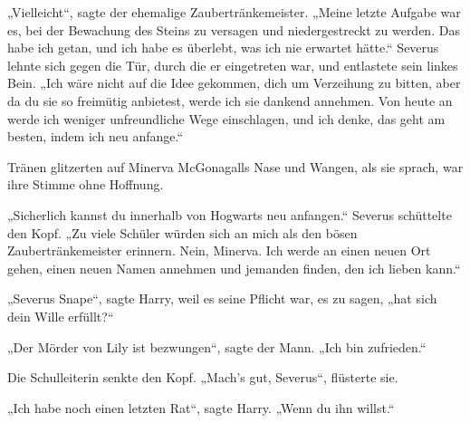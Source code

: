 „Vielleicht“, sagte der ehemalige Zaubertränkemeister. „Meine letzte Aufgabe war es, bei der Bewachung des Steins zu versagen und niedergestreckt zu werden. Das habe ich getan, und ich habe es überlebt, was ich nie erwartet hätte.“
Severus lehnte sich gegen die Tür, durch die er eingetreten war, und entlastete sein linkes Bein.
„Ich wäre nicht auf die Idee gekommen, dich um Verzeihung zu bitten, aber da du sie so freimütig anbietest, werde ich sie dankend annehmen. Von heute an werde ich weniger unfreundliche Wege einschlagen, und ich denke, das geht am besten, indem ich neu anfange.“

Tränen glitzerten auf Minerva McGonagalls Nase und Wangen, als sie sprach, war ihre Stimme ohne Hoffnung.

„Sicherlich kannst du innerhalb von Hogwarts neu anfangen.“
Severus schüttelte den Kopf.
„Zu viele Schüler würden sich an mich als den bösen Zaubertränkemeister erinnern. Nein, Minerva. Ich werde an einen neuen Ort gehen, einen neuen Namen annehmen und jemanden finden, den ich lieben kann.“

„Severus Snape“, sagte Harry, weil es seine Pflicht war, es zu sagen, „hat sich dein Wille erfüllt?“

„Der Mörder von Lily ist bezwungen“, sagte der Mann. „Ich bin zufrieden.“

Die Schulleiterin senkte den Kopf.
„Mach’s gut, Severus“, flüsterte sie.

„Ich habe noch einen letzten Rat“, sagte Harry. „Wenn du ihn willst.“

